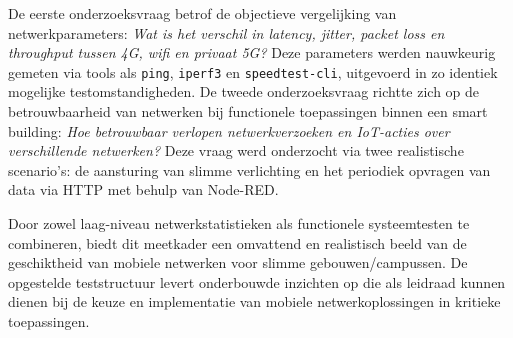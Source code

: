 De eerste onderzoeksvraag betrof de objectieve vergelijking van netwerkparameters: \textit{Wat is het verschil in latency, jitter, packet loss en throughput tussen 4G, wifi en privaat 5G?} Deze parameters werden nauwkeurig gemeten via tools als \texttt{ping}, \texttt{iperf3} en \texttt{speedtest-cli}, uitgevoerd in zo identiek mogelijke testomstandigheden. De tweede onderzoeksvraag richtte zich op de betrouwbaarheid van netwerken bij functionele toepassingen binnen een smart building: \textit{Hoe betrouwbaar verlopen netwerkverzoeken en IoT-acties over verschillende netwerken?} Deze vraag werd onderzocht via twee realistische scenario’s: de aansturing van slimme verlichting en het periodiek opvragen van data via HTTP met behulp van Node-RED.

Door zowel laag-niveau netwerkstatistieken als functionele systeemtesten te combineren, biedt dit meetkader een omvattend en realistisch beeld van de geschiktheid van mobiele netwerken voor slimme gebouwen/campussen. De opgestelde teststructuur levert onderbouwde inzichten op die als leidraad kunnen dienen bij de keuze en implementatie van mobiele netwerkoplossingen in kritieke toepassingen.

